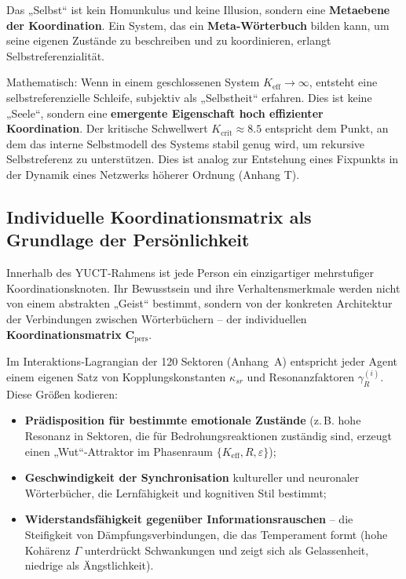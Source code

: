 \documentclass[12pt,a4paper]{article}
\newcommand{\eff}{\mathrm{eff}}
\newcommand{\Ke}{K_{\eff}}
\newcommand{\Kcrit}{K_{\mathrm{crit}}}
\begin{document}
	Das „Selbst“ ist kein Homunkulus und keine Illusion, sondern eine \textbf{Metaebene der Koordination}. Ein System, das ein \textbf{Meta‑Wörterbuch} bilden kann, um seine eigenen Zustände zu beschreiben und zu koordinieren, erlangt Selbstreferenzialität.
	
	Mathematisch: Wenn in einem geschlossenen System $\Ke \to \infty$, entsteht eine selbstreferenzielle Schleife, subjektiv als „Selbstheit“ erfahren. Dies ist keine „Seele“, sondern eine \textbf{emergente Eigenschaft hoch effizienter Koordination}. Der kritische Schwellwert $\Kcrit \approx 8.5$ entspricht dem Punkt, an dem das interne Selbstmodell des Systems stabil genug wird, um rekursive Selbstreferenz zu unterstützen. Dies ist analog zur Entstehung eines Fixpunkts in der Dynamik eines Netzwerks höherer Ordnung (Anhang T).
	
	\subsection{Individuelle Koordinationsmatrix als Grundlage der Persönlichkeit}
	\label{subsec:personality-matrix}
	
	Innerhalb des YUCT‑Rahmens ist jede Person ein einzigartiger mehrstufiger Koordinationsknoten. Ihr Bewusstsein und ihre Verhaltensmerkmale werden nicht von einem abstrakten „Geist“ bestimmt, sondern von der konkreten Architektur der Verbindungen zwischen Wörterbüchern – der individuellen \textbf{Koordinationsmatrix} $\mathbf{C}_{\text{pers}}$.
	
	Im Interaktions‑Lagrangian der 120 Sektoren (Anhang~A) entspricht jeder Agent einem eigenen Satz von Kopplungskonstanten $\kappa_{sr}$ und Resonanzfaktoren $\gamma_{R}^{(i)}$. Diese Größen kodieren:
	\begin{itemize}
		\item \textbf{Prädisposition für bestimmte emotionale Zustände} (z. B. hohe Resonanz in Sektoren, die für Bedrohungsreaktionen zuständig sind, erzeugt einen „Wut“‑Attraktor im Phasenraum $\{K_{\mathrm{eff}}, R, \varepsilon\}$);
		\item \textbf{Geschwindigkeit der Synchronisation} kultureller und neuronaler Wörterbücher, die Lernfähigkeit und kognitiven Stil bestimmt;
		\item \textbf{Widerstandsfähigkeit gegenüber Informationsrauschen} – die Steifigkeit von Dämpfungsverbindungen, die das Temperament formt (hohe Kohärenz $\Gamma$ unterdrückt Schwankungen und zeigt sich als Gelassenheit, niedrige als Ängstlichkeit).
	\end{itemize}
	
\end{document}
